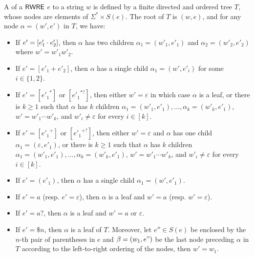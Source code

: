   \begin{definition}
  	A  of a ${\sf RWRE}$ $e$ to a string $w$ is defined by a finite directed and ordered
  	tree $T$, whose nodes are elements of $\Sigma^{\ast} \times S (e)$. %
  	The  root of $T$ is $(w, e)$, and for any node $\alpha =  	(w', e')$ in $T$, we have:
  	\begin{itemize}
  		\item If $e' = [e'_1 \cdot e'_2]$, then $\alpha$ has two children $\alpha_1 = (w'_1,
  		e'_1)$ and $\alpha_2=(w'_2, e'_2)$ where $w' = w'_1 w'_2$.
  		
  		\item If $e' = [e'_1 + e'_2]$, then $\alpha$ has a single child $\alpha_1 = (w',
  		e'_i)$ for some $i \in \{ 1, 2 \}$.
  		
  		\item If $e' = [{e'_1}^{\ast}]$ or $[{e'_1}^{\ast ?}]$, then either $w' = \varepsilon$ in which case $\alpha$ is a
  		leaf, or there is $k \geqslant 1$ such that $\alpha$ has $k$ children $\alpha_1 = (w'_1,
  		e'_1), \ldots, \alpha_k = (w'_k, e'_1)$, $w' = w'_1 \cdots w'_k$, and $w'_i \neq \varepsilon$ for every $i \in [k]$.

  		\item If $e' = [{e'_1}^{+}]$ or $[{e'_1}^{+ ?}]$, then either $w' = \varepsilon$ and $\alpha$ has one child $\alpha_1 = (\varepsilon, e'_1)$, or there is $k \geqslant 1$ such that $\alpha$ has $k$ children $\alpha_1 = (w'_1, e'_1), \ldots, \alpha_k = (w'_k, e'_1)$, $w' = w'_1 \cdots w'_k$, and $w'_i \neq \varepsilon$ for every $i \in [k]$.
%
%		
  		\item If $e' = (e'_1)$, then $\alpha$ has a single child $\alpha_1 = (w', e'_1)$.
  		\item If $e' = a$ (resp. $e' = \varepsilon$), then $\alpha$ is a leaf and
  		$w' = a$ (resp. $w' = \varepsilon$).
%		
  		\item If $e' = a?$, then $\alpha$ is a leaf and
  		$w' = a$ or $\varepsilon$.
%
		\item If $e' = \$n$, then $\alpha$ is a leaf of $T$. Moreover, let $e'' \in S(e)$ be enclosed by the $n$-th pair of parentheses in $e$ and $\beta = (w_1, e")$ be the last node preceding $\alpha$ in $T$ %
		according to the left-to-right ordering of the nodes, then $w' = w_1$.
  	\end{itemize}
  	

\end{definition}
